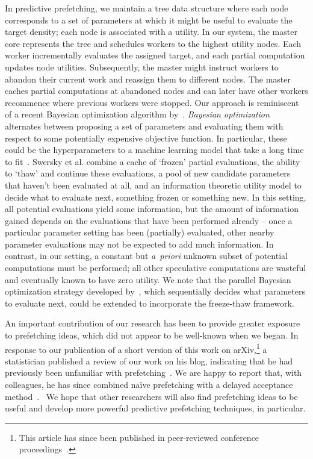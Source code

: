 \documentclass[angelino.tex]{subfiles}
\begin{document}
In predictive prefetching, we maintain a tree data structure where each node
corresponds to a set of parameters at which it might be useful to evaluate
the target density; each node is associated with a utility.
%
In our system, the master core represents the tree and schedules workers to the
highest utility nodes.
Each worker incrementally evaluates the assigned target,
and each partial computation updates node utilities.
Subsequently, the master might instruct workers to abandon their current work
and reassign them to different nodes.
The master caches partial computations at abandoned nodes and can later have
other workers recommence where previous workers were stopped.
%
Our approach is reminiscent of a recent Bayesian optimization
algorithm by~\citet{swersky:2014-freeze-thaw}.
%
\emph{Bayesian optimization} alternates between proposing a set of parameters and
evaluating them with respect to some potentially expensive objective function.
In particular, these could be the hyperparameters to a machine learning model
that take a long time to fit~\citep{snoek:2012-bayes-opt}.
%
Swersky et al. combine a cache of `frozen' partial  evaluations,
the ability to `thaw' and continue these evaluations,
a pool of new candidate parameters that haven't been evaluated at all,
and an information theoretic utility model to decide what to evaluate next,
\ie something frozen or something new.
%
In this setting, all potential evaluations yield some information, but the amount
of information gained depends on the evaluations that have been performed already
-- \eg once a particular parameter setting has been (partially) evaluated,
other nearby parameter evaluations may not be expected to add much information.
%
In contrast, in our setting, a constant but \emph{a~priori} unknown subset of
potential computations must be performed; all other speculative computations are
wasteful and eventually known to have zero utility. 
%
We note that the parallel Bayesian optimization strategy developed 
by~\citet{snoek:2012-bayes-opt},  which sequentially decides what parameters to
evaluate next, could be extended to incorporate the freeze-thaw framework.


An important contribution of our research has been to provide greater exposure
to prefetching ideas, which did not appear to be well-known when we began.
%
In response to our publication of a short version of this work on
arXiv,\footnote{This article has since been published in peer-reviewed
conference proceedings~\citep{angelino:2014-prefetching}.}
a statistician published a review of our work on his blog,
indicating that he had previously been unfamiliar with prefetching~\citep{xian-blog}.
%
We are happy to report that, with colleagues, he has since combined na\"ive
prefetching with a delayed acceptance method~\citep{banterle-2014-delayed}.~
%
We hope that other researchers will also find prefetching ideas to be useful
and develop more powerful predictive prefetching techniques, in particular.
\end{document}
